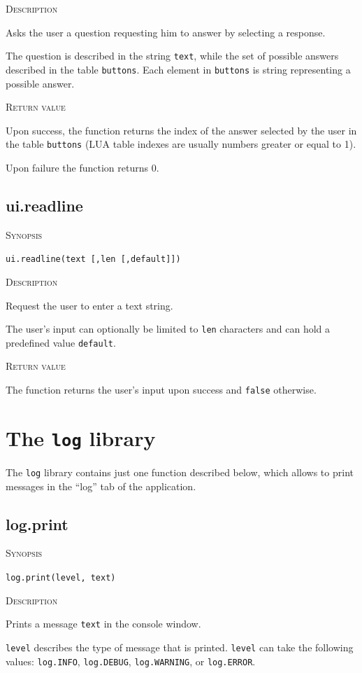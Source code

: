 \documentclass[11pt]{report}
\newcommand{\mansection}[1]{\vspace{0.5em}\par\noindent\textsc{#1}\vspace{0.5em}\par}
\newcommand{\syn}[1]{\texttt{#1}}
\begin{document}
\mansection{Description}
  Asks the user a question requesting him to answer by selecting a response.

  The question is described in the string \syn{text}, while the set of 
  possible answers described in the table \syn{buttons}. 
  Each element in \syn{buttons} is string representing a possible answer.
  
\mansection{Return value}
  Upon success, the function returns the index of the answer selected by the 
  user in the table \syn{buttons} 
  (LUA table indexes are usually numbers greater or equal to 1). 
  
  Upon failure the function returns 0.


\subsection{ui.readline}

\mansection{Synopsis}
\syn{ui.readline(text [,\syn{len} [,\syn{default}]])}

\mansection{Description}
  Request the user to enter a text string. 

  The user's input can optionally be limited to \syn{len} characters and 
  can hold a predefined value \syn{default}.
  
\mansection{Return value}
  The function returns the user's input upon success and \syn{false} otherwise.


\section{The \syn{log} library}

The \syn{log} library contains just one function described below, which allows to print messages in the ``log'' tab of the application.


\subsection{log.print}

\mansection{Synopsis}
\syn{log.print(level, text)}

\mansection{Description}
  Prints a message \syn{text} in the console window.

  \syn{level} describes the type of message that is printed. 
  \syn{level} can take the following values: \syn{log.INFO}, 
  \syn{log.DEBUG}, \syn{log.WARNING}, or \syn{log.ERROR}.
\end{document}
